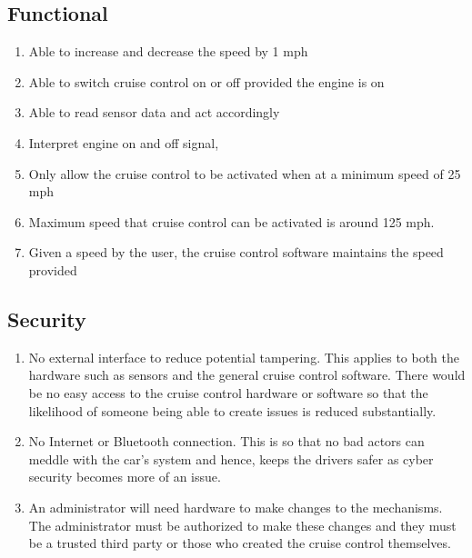 \documentclass[preprint,11pt,3p]{article}
\begin{document}
\subsection{Functional}
\begin{enumerate}
	\item Able to increase and decrease the speed by 1 mph
	\item Able to switch cruise control on or off provided the engine is on
	\item Able to read sensor data and act accordingly %
	\item Interpret engine on and off signal, 
	\item Only allow the cruise control to be activated when at a minimum speed of 25 mph %
	\item Maximum speed that cruise control can be activated is around 125 mph. 
	\item Given a speed by the user, the cruise control software maintains the speed provided
\end{enumerate}

\subsection{Security}
\begin{enumerate}
	\item No external interface to reduce potential tampering. This applies to both the hardware such as sensors and the general cruise control software. There would be no easy access to the cruise control hardware or software so that the likelihood of someone being able to create issues is reduced substantially. 
	\item No Internet or Bluetooth connection. This is so that no bad actors can meddle with the car's system and hence, keeps the drivers safer as cyber security becomes more of an issue.
	\item An administrator will need hardware to make changes to the mechanisms. The administrator must be authorized to make these changes and they must be a trusted third party or those who created the cruise control themselves. 
\end{enumerate}
\end{document}

